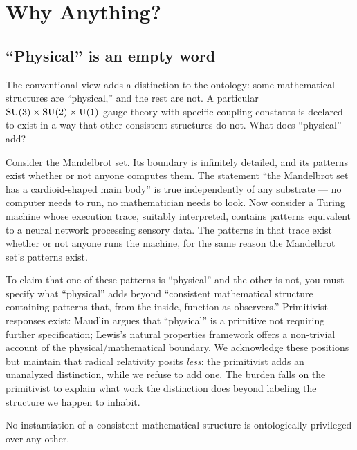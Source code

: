 
\section{Why Anything?}
\label{sec:why-anything}

\subsection{``Physical'' is an empty word}
\label{subsec:physical-empty}

The conventional view adds a distinction to the ontology: some
mathematical structures are ``physical,'' and the rest are not.  A
particular $\mathrm{SU}(3) \times \mathrm{SU}(2) \times \mathrm{U}(1)$ gauge theory with
specific coupling constants is declared to exist in a way that other
consistent structures do not.  What does ``physical'' add?

Consider the Mandelbrot set.  Its boundary is infinitely detailed, and
its patterns exist whether or not anyone computes them.  The statement
``the Mandelbrot set has a cardioid-shaped main body'' is true
independently of any substrate --- no computer needs to run, no
mathematician needs to look.  Now consider a Turing machine whose
execution trace, suitably interpreted, contains patterns equivalent to
a neural network processing sensory data.  The patterns in that trace
exist whether or not anyone runs the machine, for the same reason the
Mandelbrot set's patterns exist.

To claim that one of these patterns is ``physical'' and the other is
not, you must specify what ``physical'' adds beyond ``consistent
mathematical structure containing patterns that, from the inside,
function as observers.''  Primitivist responses exist: Maudlin argues
that ``physical'' is a primitive not requiring further
specification; Lewis's natural properties framework offers a
non-trivial account of the physical/mathematical
boundary.  We acknowledge these positions but maintain that radical
relativity posits \emph{less}: the primitivist adds an unanalyzed
distinction, while we refuse to add one.  The burden falls on the
primitivist to explain what work the distinction does beyond labeling
the structure we happen to inhabit.

\begin{postulate}
\label{post:radical-relativity}
No instantiation of a consistent mathematical structure is
ontologically privileged over any other.
\end{postulate}

